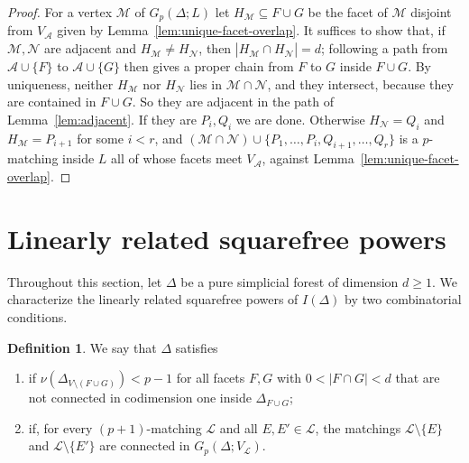 \documentclass{amsart}
\theoremstyle{definition}
\newtheorem{Definition}[Theorem]{Definition}
\theoremstyle{remark}
\begin{document}
\begin{proof}
For a vertex $\mathcal M$ of $G_p(\Delta;L)$ let $H_{\mathcal M}\subseteq F\cup G$ be the facet of $\mathcal M$ disjoint from $V_{\mathcal A}$ given by Lemma~\ref{lem:unique-facet-overlap}. It suffices to show that, if $\mathcal M,\mathcal N$ are adjacent and $H_{\mathcal M}\neq H_{\mathcal N}$, then $|H_{\mathcal M}\cap H_{\mathcal N}|=d$; following a path from $\mathcal A\cup\{F\}$ to $\mathcal A\cup\{G\}$ then gives a proper chain from $F$ to $G$ inside $F\cup G$. By uniqueness, neither $H_{\mathcal M}$ nor $H_{\mathcal N}$ lies in $\mathcal M\cap\mathcal N$, and they intersect, because they are contained in $F\cup G$. So they are adjacent in the path of Lemma~\ref{lem:adjacent}. If they are $P_i,Q_i$ we are done. Otherwise $H_{\mathcal N}=Q_i$ and $H_{\mathcal M}=P_{i+1}$ for some $i<r$, and $(\mathcal M\cap\mathcal N)\cup\{P_1,\ldots,P_i,Q_{i+1},\ldots,Q_r\}$ is a $p$-matching inside $L$ all of whose facets meet $V_{\mathcal A}$, against Lemma~\ref{lem:unique-facet-overlap}.
\end{proof}



\section{Linearly related squarefree powers}\label{sec:linear-related}

Throughout this section, let $\Delta$ be a pure simplicial forest of
dimension $d\geq1$. We characterize the linearly related squarefree
powers of $I(\Delta)$ by two combinatorial conditions.

\begin{Definition}\label{def:conditions}
We say that $\Delta$ satisfies
\begin{enumerate}
\item[\textnormal{(C1)$_p$}] if $\nu(\Delta_{V\setminus(F\cup G)})<p-1$ for all facets $F,G$ with $0<|F\cap G|<d$ that are not connected in codimension one inside $\Delta_{F\cup G}$;
\item[\textnormal{(C2)$_p$}] if, for every $(p+1)$-matching $\mathcal L$ and all $E,E'\in\mathcal L$, the matchings $\mathcal L\setminus\{E\}$ and $\mathcal L\setminus\{E'\}$ are connected in $G_p(\Delta;V_{\mathcal L})$.
\end{enumerate}
\end{Definition}
\end{document}
